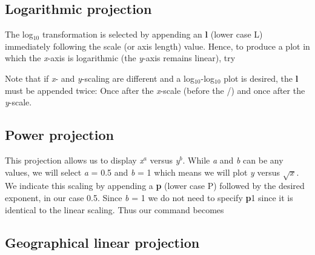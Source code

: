 \subsection{Logarithmic projection}


The log$_{10}$ transformation is selected by appending an {\bf l}
(lower case L) immediately following the scale (or axis length)
value.  Hence, to produce a plot in which the {\it x}-axis is
logarithmic (the {\it y}-axis remains linear), try 

 

\par Note that if {\it x}- and {\it y}-scaling are different and
a log$_{10}$-log$_{10}$ plot is desired, the {\bf l} must be
appended twice: Once after the {\it x}-scale (before the /) and
once after the {\it y}-scale. 

\subsection{Power projection}


This projection allows us to display {\it x$^a$} versus {\it y$^b$}.
While {\it a} and {\it b} can be any values, we will select {\it a}
= 0.5 and {\it b} = 1 which means we will plot {\it y} versus $\sqrt{x}$.
We indicate this scaling by appending a {\bf p} (lower case P) followed
by the desired exponent, in our case 0.5.  Since {\it b} = 1 we do not
need to specify {\bf p}1 since it is identical to the linear scaling.
Thus our command becomes

 

\subsection{Geographical linear projection}
\label{sec:linear}


